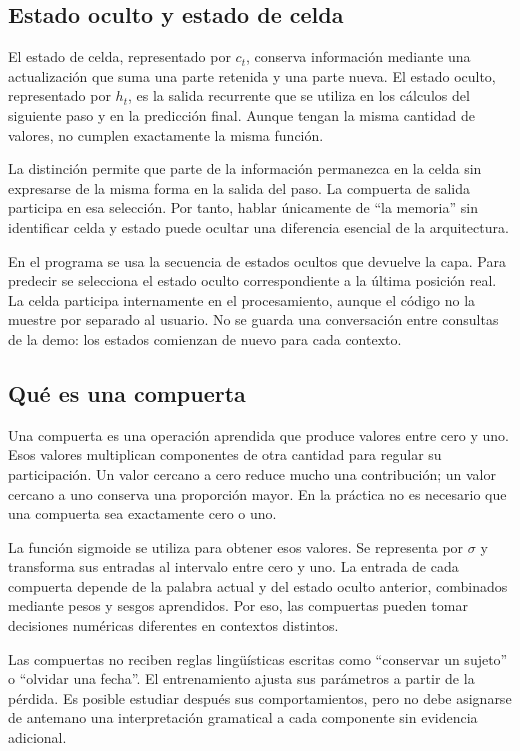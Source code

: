 \subsection{Estado oculto y estado de celda}
El estado de celda, representado por $c_t$, conserva información mediante una actualización que suma una parte retenida y una parte nueva. El estado oculto, representado por $h_t$, es la salida recurrente que se utiliza en los cálculos del siguiente paso y en la predicción final. Aunque tengan la misma cantidad de valores, no cumplen exactamente la misma función.

La distinción permite que parte de la información permanezca en la celda sin expresarse de la misma forma en la salida del paso. La compuerta de salida participa en esa selección. Por tanto, hablar únicamente de ``la memoria'' sin identificar celda y estado puede ocultar una diferencia esencial de la arquitectura.

En el programa se usa la secuencia de estados ocultos que devuelve la capa. Para predecir se selecciona el estado oculto correspondiente a la última posición real. La celda participa internamente en el procesamiento, aunque el código no la muestre por separado al usuario. No se guarda una conversación entre consultas de la demo: los estados comienzan de nuevo para cada contexto.

\subsection{Qué es una compuerta}
Una compuerta es una operación aprendida que produce valores entre cero y uno. Esos valores multiplican componentes de otra cantidad para regular su participación. Un valor cercano a cero reduce mucho una contribución; un valor cercano a uno conserva una proporción mayor. En la práctica no es necesario que una compuerta sea exactamente cero o uno.

La función sigmoide se utiliza para obtener esos valores. Se representa por $\sigma$ y transforma sus entradas al intervalo entre cero y uno. La entrada de cada compuerta depende de la palabra actual y del estado oculto anterior, combinados mediante pesos y sesgos aprendidos. Por eso, las compuertas pueden tomar decisiones numéricas diferentes en contextos distintos.

Las compuertas no reciben reglas lingüísticas escritas como ``conservar un sujeto'' o ``olvidar una fecha''. El entrenamiento ajusta sus parámetros a partir de la pérdida. Es posible estudiar después sus comportamientos, pero no debe asignarse de antemano una interpretación gramatical a cada componente sin evidencia adicional.

